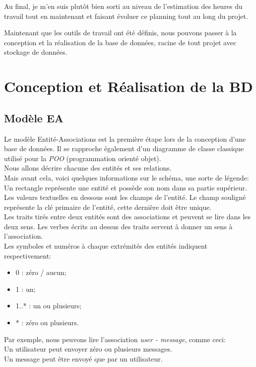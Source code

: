 \documentclass[
    iai, %
    il, %
]{heig-tb}
\begin{document}
Au final, je m'en suis plutôt bien sorti au niveau de l'estimation des heures du travail tout en maintenant et faisant évoluer ce planning tout au long du projet.

Maintenant que les outils de travail ont été définis, nous pouvons passer à la conception et la réalisation de la base de données, racine de tout projet avec stockage de données.

\chapter{Conception et Réalisation de la BD}

\section{Modèle EA}
Le modèle Entité-Associations est la première étape lors de la conception d'une base de données. Il se rapproche également d'un diagramme de classe classique utilisé pour la \emph{POO} (programmation orienté objet).\\
Nous allons décrire chacune des entités et ses relations.\\
Mais avant cela, voici quelques informations sur le schéma, une sorte de légende:\\
Un rectangle représente une entité et possède son nom dans sa partie supérieur.\\
Les valeurs textuelles en dessous sont les champs de l'entité. Le champ souligné représente la clé primaire de l'entité, cette dernière doit être unique.\\
Les traits tirés entre deux entités sont des associations et peuvent se lire dans les deux sens. Les verbes écrits au dessus des traits servent à donner un sens à l'association.\\
Les symboles et numéros à chaque extrémités des entités indiquent respectivement:
\begin{itemize}
    \item 0 : zéro / aucun;
    \item 1 : un;
    \item 1..* : un ou plusieurs;
    \item * : zéro ou plusieurs.
\end{itemize}

Par exemple, nous peuvons lire l'association \emph{user - message}, comme ceci:\\
Un utilisateur peut envoyer zéro ou plusieurs messages.\\
Un message peut être envoyé que par un utilisateur.
\end{document}
